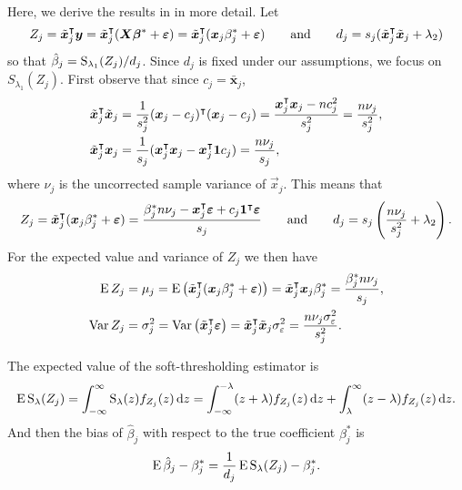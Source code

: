 Here, we derive the results in  in more detail. Let
\[
  {Z_j} = \tilde{\boldsymbol{x}}_j^\intercal \boldsymbol{y} = \tilde{\boldsymbol{x}}_j^\intercal(\boldsymbol{X}\boldsymbol{\beta}^* + \boldsymbol{\varepsilon}) = \tilde{\boldsymbol{x}}_j^\intercal (\boldsymbol{x}_j\beta_j^* + \boldsymbol{\varepsilon})
  \qquad
  \text{and}
  \qquad
  d_j = s_j(\tilde{\boldsymbol{x}}_j^\intercal \tilde{\boldsymbol{x}}_j + \lambda_2)
\]
so that \(\hat{\beta}_j = \operatorname{S}_{\lambda_1}({Z_j})/d_j\). Since \(d_j\) is fixed under our
assumptions, we focus on \(S_{\lambda_1}({Z_j})\). First observe that since \(c_j =
\bar{\bm{x}}_j\),
\[
  \begin{aligned}
    \tilde{\boldsymbol{x}}_j^\intercal \tilde{\boldsymbol{x}}_j & = \frac{1}{s_j^2}(\boldsymbol{x}_j - c_j)^\intercal (\boldsymbol{x}_j - c_j) = \frac{\boldsymbol{x}_j^\intercal\boldsymbol{x}_j - nc_j^2}{s^2_j} = \frac{n \nu_j}{s_j^2}, \\
    \tilde{\boldsymbol{x}}_j^\intercal \boldsymbol{x}_j         & = \frac{1}{s_j}(\boldsymbol{x}_j^\intercal \boldsymbol{x}_j - \boldsymbol{x}_j^\intercal \boldsymbol{1} c_j) = \frac{n \nu_j}{s_j},
  \end{aligned}
\]
where \(\nu_j\) is the uncorrected sample variance of \(\vec{x}_j\). This means that
\begin{equation}
  {Z_j} = \tilde{\boldsymbol{x}}_j^\intercal (\boldsymbol{x}_j\beta_j^* + \boldsymbol{\varepsilon}) = \frac{\beta_j^* n \nu_j- \boldsymbol{x}_j^\intercal \boldsymbol{\varepsilon} + c_j \boldsymbol{1}^\intercal \bm{\varepsilon}}{s_j}
  \qquad\text{and}\qquad
  d_j = s_j\left(\frac{n \nu_j}{s_j^2} + \lambda_2\right).
\end{equation}
For the expected value and variance of \({Z_j}\) we then have
\begin{align*}
  \operatorname{E} {Z_j}   & = \mu_j = \operatorname{E} \left( \tilde{\boldsymbol{x}}_j^\intercal (\boldsymbol{x}_j\beta^*_j + \boldsymbol{\varepsilon}) \right)  = \tilde{\boldsymbol{x}}_j^\intercal\boldsymbol{x}_j \beta^*_j = \frac{\beta_j^* n \nu_j}{s_j},            \\
  \operatorname{Var} {Z_j} & = \sigma_j^2 = \operatorname{Var}\left(\tilde{\boldsymbol{x}}_j ^\intercal \boldsymbol{\varepsilon}\right) = \tilde{\boldsymbol{x}}_j^\intercal \tilde{\boldsymbol{x}}_j\sigma_\varepsilon^2 = \frac{n\nu_j\sigma_\varepsilon^2}{s_j^2}.
\end{align*}

The expected value of the soft-thresholding estimator is
\begin{equation*}
  \operatorname{E} \operatorname{S}_\lambda({Z_j}) = \int_{-\infty}^\infty \operatorname{S}_\lambda(z) f_{Z_j}(z) \mathop{}\!\mathrm{d} z
  = \int_{-\infty}^{-\lambda}(z + \lambda)f_{Z_j}(z) \mathop{}\!\mathrm{d} z + \int_{\lambda}^\infty (z - \lambda)f_{Z_j}(z) \mathop{}\!\mathrm{d} z.
\end{equation*}
And then the bias of \(\hat\beta_j\) with respect to the true coefficient \(\beta_j^*\) is
\begin{equation*}
  \operatorname{E} \hat\beta_j - \beta_j^* = \frac{1}{d_j}\operatorname{E} \operatorname{S}_\lambda({Z_j}) - \beta^*_j.
\end{equation*}

